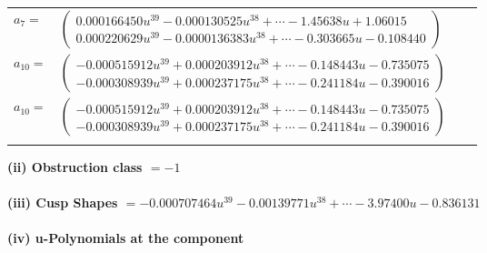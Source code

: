 \documentclass[1p]{elsarticle_modified}
\theoremstyle{definition}
\begin{document}
\begin{tabular}{m{7pt} m{180pt} m{7pt} m{180pt} }
\flushright $a_{7}=$&$\begin{pmatrix}0.000166450 u^{39}-0.000130525 u^{38}+\cdots-1.45638 u+1.06015\\0.000220629 u^{39}-0.0000136383 u^{38}+\cdots-0.303665 u-0.108440\end{pmatrix}$ \\
\flushright $a_{10}=$&$\begin{pmatrix}-0.000515912 u^{39}+0.000203912 u^{38}+\cdots-0.148443 u-0.735075\\-0.000308939 u^{39}+0.000237175 u^{38}+\cdots-0.241184 u-0.390016\end{pmatrix}$\\ \flushright $a_{10}=$&$\begin{pmatrix}-0.000515912 u^{39}+0.000203912 u^{38}+\cdots-0.148443 u-0.735075\\-0.000308939 u^{39}+0.000237175 u^{38}+\cdots-0.241184 u-0.390016\end{pmatrix}$\\&\end{tabular}
\flushleft \textbf{(ii) Obstruction class $= -1$}\\~\\
\flushleft \textbf{(iii) Cusp Shapes $= -0.000707464 u^{39}-0.00139771 u^{38}+\cdots-3.97400 u-0.836131$}\\~\\
\newpage\renewcommand{\arraystretch}{1}
\flushleft \textbf{(iv) u-Polynomials at the component}\newline \\
\end{document}
